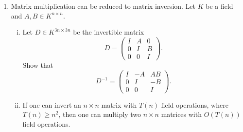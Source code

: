 \documentclass[11pt]{article}
\begin{document}
\begin{enumerate}[1)]
\begin{enumerate}[i)]
	\item Show that $a \cdot b = a_h \cdot b_h \cdot 2^n + (a_h \cdot b_l + a_l \cdot b_h) \cdot 2^{n/2} + a_l \cdot b_l$.		

	\item Conclude very carefully that two $n$-bit numbers can be multiplied by resorting to three multiplications of $n/2$-bit numbers and $O(n)$ basic operations. 

	\item Conclude that two $n$-bit numbers can be computed in time $O(n^{\log_2(3)})$.
\end{enumerate}

\item Matrix multiplication can be reduced to matrix inversion. Let $K$ be a field and $A,B ∈ K^{n × n}$.
  \begin{enumerate}[i)]
  \item 
  Let $D ∈ K^{3n ×3n}$ be the invertible  matrix
  \begin{displaymath}
    D =
    \begin{pmatrix}
      I & A & 0 \\
      0 & I & B \\
      0 & 0 & I
    \end{pmatrix}. 
  \end{displaymath}
  Show that
  \begin{displaymath}
    D^{-1}  =
    \begin{pmatrix}
      I & -A & AB \\
      0 & I & -B \\
      0 & 0 & I
    \end{pmatrix}. 
  \end{displaymath}
\item If one can invert an $n×n$ matrix with $T(n)$ field operations, where $T(n) ≥ n^2$, then one can multiply two $n×n$ matrices with  $O(T(n))$ field operations. 
\end{enumerate}

\end{enumerate}
  
\end{document}
